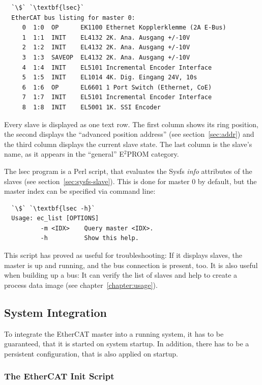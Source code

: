 \documentclass[a4paper,12pt,BCOR6mm,bibtotoc,idxtotoc]{scrbook}
\begin{document}
\begin{lstlisting}
  `\$` `\textbf{lsec}`
  EtherCAT bus listing for master 0:
     0  1:0  OP      EK1100 Ethernet Kopplerklemme (2A E-Bus)
     1  1:1  INIT    EL4132 2K. Ana. Ausgang +/-10V
     2  1:2  INIT    EL4132 2K. Ana. Ausgang +/-10V
     3  1:3  SAVEOP  EL4132 2K. Ana. Ausgang +/-10V
     4  1:4  INIT    EL5101 Incremental Encoder Interface
     5  1:5  INIT    EL1014 4K. Dig. Eingang 24V, 10s
     6  1:6  OP      EL6601 1 Port Switch (Ethernet, CoE)
     7  1:7  INIT    EL5101 Incremental Encoder Interface
     8  1:8  INIT    EL5001 1K. SSI Encoder
\end{lstlisting}

Every slave is displayed as one text row. The first column shows its
ring position, the second displays the ``advanced position address''
(see section~\ref{sec:addr}) and the third column displays the current
slave state. The last column is the slave's name, as it appears in the
``general'' E$^2$PROM category.

The lsec program is a Perl script, that evaluates the Sysfs
\textit{info} attributes of the slaves (see
section~\ref{sec:sysfs-slave}). This is done for master $0$ by
default, but the master index can be specified via command line:

\begin{lstlisting}
  `\$` `\textbf{lsec -h}`
  Usage: ec_list [OPTIONS]
          -m <IDX>    Query master <IDX>.
          -h          Show this help.
\end{lstlisting}

This script has proved as useful for troubleshooting: If it displays
slaves, the master is up and running, and the bus connection is
present, too. It is also useful when building up a bus: It can verify
the list of slaves and help to create a process data image (see
chapter~\ref{chapter:usage}).


\subsection{System Integration}
\label{sec:system}

To integrate the EtherCAT master into a running system, it has to be
guaranteed, that it is started on system startup. In addition, there has
to be a persistent configuration, that is also applied on startup.

\subsubsection{The EtherCAT Init Script}
\label{sec:init}
\end{document}
